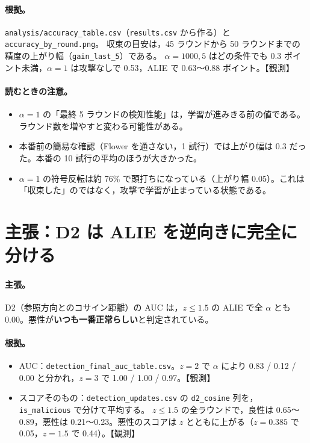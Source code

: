 \documentclass[a4j, dvipdfmx]{jsarticle}  %
\begin{document}
\paragraph{根拠。}
\texttt{analysis/accuracy\_table.csv}（\texttt{results.csv} から作る）と \texttt{accuracy\_by\_round.png}。
収束の目安は，45 ラウンドから 50 ラウンドまでの精度の上がり幅（\texttt{gain\_last\_5}）である。
$\alpha = 1000, 5$ はどの条件でも 0.3 ポイント未満，$\alpha = 1$ は攻撃なしで 0.53，ALIE で 0.63〜0.88 ポイント。【観測】

\paragraph{読むときの注意。}
\begin{itemize}
  \item $\alpha = 1$ の「最終 5 ラウンドの検知性能」は，学習が進みきる前の値である。ラウンド数を増やすと変わる可能性がある。
  \item 本番前の簡易な確認（Flower を通さない，1 試行）では上がり幅は 0.3 だった。本番の 10 試行の平均のほうが大きかった。
  \item $\alpha = 1$ の符号反転は約 76\% で頭打ちになっている（上がり幅 0.05）。これは「収束した」のではなく，攻撃で学習が止まっている状態である。
\end{itemize}

\section{主張：D2 は ALIE を逆向きに完全に分ける}
\label{sec:claim-d2}

\paragraph{主張。}
D2（参照方向とのコサイン距離）の AUC は，$z \le 1.5$ の ALIE で全 $\alpha$ とも 0.00。悪性が\textbf{いつも一番正常らしい}と判定されている。

\paragraph{根拠。}
\begin{itemize}
  \item AUC：\texttt{detection\_final\_auc\_table.csv}。$z = 2$ で $\alpha$ により 0.83 / 0.12 / 0.00 と分かれ，$z = 3$ で 1.00 / 1.00 / 0.97。【観測】
  \item スコアそのもの：\texttt{detection\_updates.csv} の \texttt{d2\_cosine} 列を，\texttt{is\_malicious} で分けて平均する。
        $z \le 1.5$ の全ラウンドで，良性は 0.65〜0.89，悪性は 0.21〜0.23。悪性のスコアは $z$ とともに上がる（$z = 0.385$ で 0.05，$z = 1.5$ で 0.44）。【観測】
\end{itemize}
\end{document}
